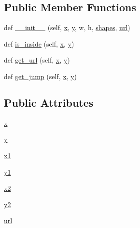\subsection*{Public Member Functions}
\begin{DoxyCompactItemize}
\item 
def \hyperlink{classsmacc__viewer_1_1xdot_1_1xdot_1_1Node_a295647e1c99438b2ea6750d6b3fdf059}{\+\_\+\+\_\+init\+\_\+\+\_\+} (self, \hyperlink{classsmacc__viewer_1_1xdot_1_1xdot_1_1Node_a80b18bbe2fe72d1cd96ecf9a27f640d0}{x}, \hyperlink{classsmacc__viewer_1_1xdot_1_1xdot_1_1Node_a0bfff3077b9bcf79cc0a3280d90b92ac}{y}, w, h, \hyperlink{classsmacc__viewer_1_1xdot_1_1xdot_1_1CompoundShape_af10de5e0141d75d95ad8b85cb7baf7ea}{shapes}, \hyperlink{classsmacc__viewer_1_1xdot_1_1xdot_1_1Node_af3f695c93d9d48ba998635c34580b607}{url})
\item 
def \hyperlink{classsmacc__viewer_1_1xdot_1_1xdot_1_1Node_a226e2f0e68d1bc9092a6c824359724d3}{is\+\_\+inside} (self, \hyperlink{classsmacc__viewer_1_1xdot_1_1xdot_1_1Node_a80b18bbe2fe72d1cd96ecf9a27f640d0}{x}, \hyperlink{classsmacc__viewer_1_1xdot_1_1xdot_1_1Node_a0bfff3077b9bcf79cc0a3280d90b92ac}{y})
\item 
def \hyperlink{classsmacc__viewer_1_1xdot_1_1xdot_1_1Node_abd7b7a8ce71efaf8eaaef1f36f3ebdd1}{get\+\_\+url} (self, \hyperlink{classsmacc__viewer_1_1xdot_1_1xdot_1_1Node_a80b18bbe2fe72d1cd96ecf9a27f640d0}{x}, \hyperlink{classsmacc__viewer_1_1xdot_1_1xdot_1_1Node_a0bfff3077b9bcf79cc0a3280d90b92ac}{y})
\item 
def \hyperlink{classsmacc__viewer_1_1xdot_1_1xdot_1_1Node_a4fb47aef711a242035732936c095cb6d}{get\+\_\+jump} (self, \hyperlink{classsmacc__viewer_1_1xdot_1_1xdot_1_1Node_a80b18bbe2fe72d1cd96ecf9a27f640d0}{x}, \hyperlink{classsmacc__viewer_1_1xdot_1_1xdot_1_1Node_a0bfff3077b9bcf79cc0a3280d90b92ac}{y})
\end{DoxyCompactItemize}
\subsection*{Public Attributes}
\begin{DoxyCompactItemize}
\item 
\hyperlink{classsmacc__viewer_1_1xdot_1_1xdot_1_1Node_a80b18bbe2fe72d1cd96ecf9a27f640d0}{x}
\item 
\hyperlink{classsmacc__viewer_1_1xdot_1_1xdot_1_1Node_a0bfff3077b9bcf79cc0a3280d90b92ac}{y}
\item 
\hyperlink{classsmacc__viewer_1_1xdot_1_1xdot_1_1Node_a8cbebc88246c7e6ce8f45d02ba34637f}{x1}
\item 
\hyperlink{classsmacc__viewer_1_1xdot_1_1xdot_1_1Node_a212fc443a78aadd8f291678689df4587}{y1}
\item 
\hyperlink{classsmacc__viewer_1_1xdot_1_1xdot_1_1Node_ab9a94d7f15287ea05b88003631ff6cbe}{x2}
\item 
\hyperlink{classsmacc__viewer_1_1xdot_1_1xdot_1_1Node_acbf410115b432ecb490f469f7d477a2a}{y2}
\item 
\hyperlink{classsmacc__viewer_1_1xdot_1_1xdot_1_1Node_af3f695c93d9d48ba998635c34580b607}{url}
\end{DoxyCompactItemize}


